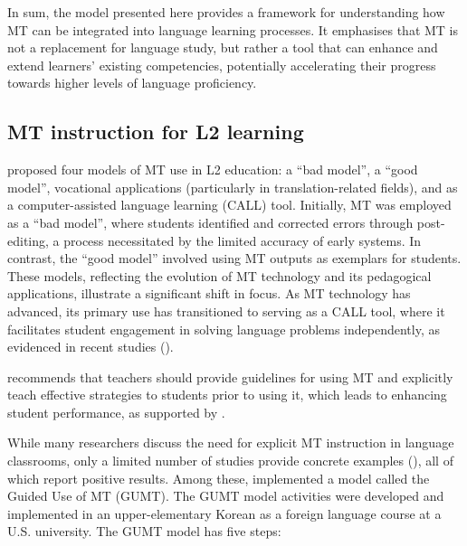 \documentclass[output=paper]{langscibook}
\begin{document}
In sum, the model presented here provides a framework for understanding how MT can be integrated into language learning processes. It emphasises that MT is not a replacement for language study, but rather a tool that can enhance and extend learners’ existing competencies, potentially accelerating their progress towards higher levels of language proficiency.

\subsection{MT instruction for L2 learning}

\citet{nino09} proposed four models of MT use in L2 education: a “bad model”, a “good model”, vocational applications (particularly in translation-related fields), and as a computer-assisted language learning (CALL) tool. Initially, MT was employed as a “bad model”, where students identified and corrected errors through post-editing, a process necessitated by the limited accuracy of early systems. In contrast, the “good model” involved using MT outputs as exemplars for students. These models, reflecting the evolution of MT technology and its pedagogical applications, illustrate a significant shift in focus. As MT technology has advanced, its primary use has transitioned to serving as a CALL tool, where it facilitates student engagement in solving language problems independently, as evidenced in recent studies (\citealt{lee20, stapleton2019, tsai2019}).

\citet{lee23} recommends that teachers should provide guidelines for using MT and explicitly teach effective strategies to students prior to using it, which leads to enhancing student performance, as supported by \citet{oneill16}.

While many researchers discuss the need for explicit MT instruction in language classrooms, only a limited number of studies provide concrete examples (\citealt{cancino21, changchenl22, mirzaeian21, oneill16, ryu2022}), all of which report positive results. Among these, \citet{ryu2022} implemented a model called the Guided Use of MT (GUMT). The GUMT model activities were developed and implemented in an upper-elementary Korean as a foreign language course at a U.S. university. The GUMT model has five steps:
\end{document}
